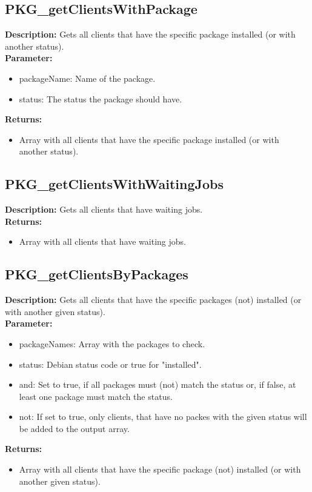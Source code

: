 \subsection{PKG\_getClientsWithPackage}
\textbf{Description:} Gets all clients that have the specific package installed (or with another status).\\
\textbf{Parameter:}
\begin{itemize}
\item packageName: Name of the package.
\item status: The status the package should have.
\end{itemize}
\textbf{Returns:}
\begin{itemize}
\item Array with all clients that have the specific package installed (or with another status).
\end{itemize}

\subsection{PKG\_getClientsWithWaitingJobs}
\textbf{Description:} Gets all clients that have waiting jobs.\\
\textbf{Returns:}
\begin{itemize}
\item Array with all clients that have waiting jobs.
\end{itemize}

\subsection{PKG\_getClientsByPackages}
\textbf{Description:} Gets all clients that have the specific packages (not) installed (or with another given status).\\
\textbf{Parameter:}
\begin{itemize}
\item packageNames: Array with the packages to check.
\item status: Debian status code or true for "installed".
\item and: Set to true, if all packages must (not) match the status or, if false, at least one package must match the status.
\item not: If set to true, only clients, that have no packes with the given status will be added to the output array.
\end{itemize}
\textbf{Returns:}
\begin{itemize}
\item Array with all clients that have the specific package (not) installed (or with another given status).
\end{itemize}

